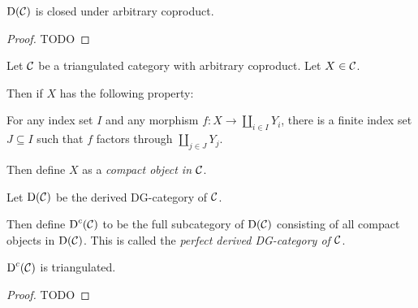 \begin{proposition}
    \( \operatorname{D}({\mathcal{C}}) \) is closed under arbitrary coproduct.
\end{proposition}
\begin{proof}
    TODO
\end{proof}


\begin{definition}
    Let \( {\mathcal{C}} \) be a triangulated category with arbitrary coproduct. Let \( X \in {\mathcal{C}} \). 
    
    Then if \( X \) has the following property:
    
    For any index set \( I \) and any morphism \( f: X \to \coprod_{i \in I} Y_i \), there is a finite index set \( J \subseteq I \) such that \( f \) factors through \( \coprod_{j \in J} Y_j \).
    
    Then define \( X \) as a \emph{compact object in \( {\mathcal{C}} \)}.
\end{definition}

\begin{definition}
    Let \( \operatorname{D}({\mathcal{C}}) \) be the derived DG-category of \( {\mathcal{C}} \).

    Then define \( \operatorname{D}^c({\mathcal{C}}) \) to be the full subcategory of \( \operatorname{D}({\mathcal{C}}) \) consisting of all compact objects in \( \operatorname{D}({\mathcal{C}}) \). This is called the \emph{perfect derived DG-category of \( {\mathcal{C}} \)}.
\end{definition}

\begin{proposition}
    \( \operatorname{D}^c({\mathcal{C}}) \) is triangulated.
\end{proposition}
\begin{proof}
    TODO
\end{proof}


